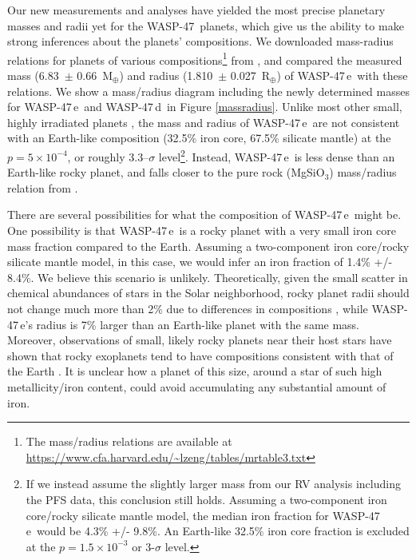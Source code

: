 \documentclass{emulateapj}
\newcommand{\ron}{\color{black}}
\newcommand{\thisstar}{WASP-47}
\newcommand{\thissecondplanet}{WASP-47\,e}
\newcommand{\thisthirdplanet}{WASP-47\,d}
\newcommand{\mearth}{M$_\oplus$}
\newcommand{\rearth}{R$_\oplus$}
\newcommand{\rple}{1.810}
\newcommand{\urple}{0.027}
\newcommand{\mple}{6.83}
\newcommand{\umple}{0.66}
\begin{document}
Our new measurements and analyses have yielded the most precise planetary masses and radii yet for the \thisstar\ planets, which give us the ability to make strong inferences about the planets' compositions. We downloaded mass-radius relations for planets of various compositions\footnote{The mass/radius relations are available at \url{https://www.cfa.harvard.edu/~lzeng/tables/mrtable3.txt}} from \citet{zeng}, and compared the measured mass (\mple\ $\pm$ \umple\ \mearth) and radius (\rple\ $\pm$ \urple\ \rearth) of \thissecondplanet\ with these relations. We show a mass/radius diagram including the newly determined masses for \thissecondplanet\ and \thisthirdplanet\ in Figure \ref{massradius}. Unlike most other small, highly irradiated planets \citep{dressingk93}, the mass and radius of \thissecondplanet\ are not consistent with an Earth-like composition {\ron (32.5\% iron core, 67.5\% silicate mantle)} at the $p = 5\times 10^{-4}$, or roughly 3.3--$\sigma$ level\footnote{If we instead assume the slightly larger mass from our RV analysis including the PFS data, this conclusion still holds. {\ron Assuming a two-component iron core/rocky silicate mantle model, the median iron fraction for \thissecondplanet\ would be 4.3\% +/- 9.8\%. An Earth-like 32.5\% iron core fraction is excluded at the $p=1.5 \times 10^{-3}$ or 3-$\sigma$ level.}}. Instead, \thissecondplanet\ is less dense than an Earth-like rocky planet, and falls closer to the pure rock (MgSiO$_3$) mass/radius relation from \citet{zeng}.

There are several possibilities for what the composition of \thissecondplanet\ might be. One possibility is that \thissecondplanet\ is a rocky planet with a very small iron core mass fraction compared to the Earth. {\ron Assuming a two-component iron core/rocky silicate mantle model, in this case, we would infer an iron fraction of 1.4\% +/- 8.4\%.} We believe this scenario is unlikely. Theoretically, given the small scatter in chemical abundances of stars in the Solar neighborhood, rocky planet radii should not change much more than 2\% due to differences in compositions \citep{grasset}, while \thissecondplanet's radius is 7\% larger than an Earth-like planet with the same mass. Moreover, observations of small, likely rocky planets near their host stars have shown that rocky exoplanets tend to have compositions consistent with that of the Earth \citep{dressingk93, buchhave16}. It is unclear how a planet of this size, around a star of such high metallicity/iron content, could avoid accumulating any substantial amount of iron. 
\end{document}
